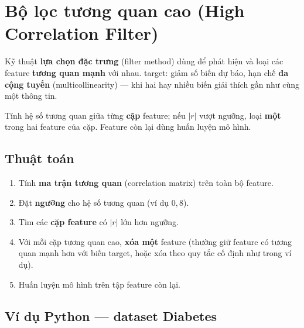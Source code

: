 \section{Bộ lọc tương quan cao (High Correlation Filter)}
\label{sec:high-correlation-filter}

\begin{dinhnghia}[title={Bộ lọc tương quan cao}]
Kỹ thuật \textbf{lựa chọn đặc trưng} (filter method) dùng để phát hiện và loại các feature \textbf{tương quan mạnh} với nhau. target: giảm số biến dự báo, hạn chế \textbf{đa cộng tuyến} (multicollinearity) --- khi hai hay nhiều biến giải thích gần như cùng một thông tin.
\end{dinhnghia}

\begin{ynghia}[title={Nguyên tắc hoạt động}]
Tính hệ số tương quan giữa từng \textbf{cặp} feature; nếu $|r|$ vượt ngưỡng, loại \textbf{một} trong hai feature của cặp. Feature còn lại dùng huấn luyện mô hình.
\end{ynghia}

\subsection{Thuật toán}

\begin{phuongphap}[title={Các bước triển khai}]
\begin{enumerate}
  \item Tính \textbf{ma trận tương quan} (correlation matrix) trên toàn bộ feature.
  \item Đặt \textbf{ngưỡng} cho hệ số tương quan (ví dụ $0{,}8$).
  \item Tìm các \textbf{cặp feature} có $|r|$ lớn hơn ngưỡng.
  \item Với mỗi cặp tương quan cao, \textbf{xóa một} feature (thường giữ feature có tương quan mạnh hơn với biến target, hoặc xóa theo quy tắc cố định như trong ví dụ).
  \item Huấn luyện mô hình trên tập feature còn lại.
\end{enumerate}
\end{phuongphap}

\subsection{Ví dụ Python --- dataset Diabetes}

